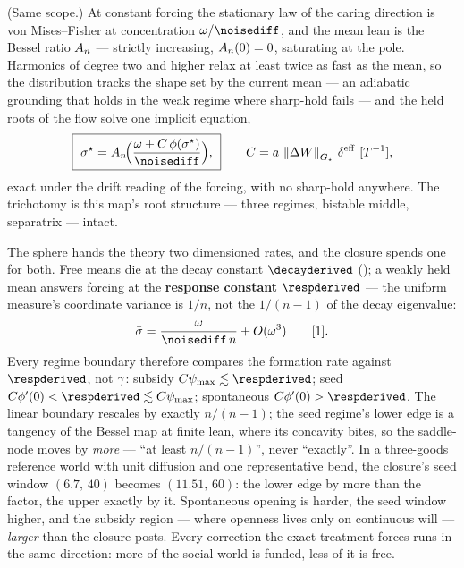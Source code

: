 \documentclass[../main]{subfiles}
\begin{document}
\begin{theorem}%
  (Same scope.) At constant forcing the stationary law of the caring direction is von
  Mises--Fisher at concentration $\will/\noisediff$, and the mean lean is the Bessel
  ratio $A\sb{n}$ --- strictly increasing, $A\sb{n}(0)=0$, saturating at the pole.
  Harmonics of degree two and higher relax at least twice as fast as the mean, so the
  distribution tracks the shape set by the current mean --- an adiabatic grounding that
  holds in the weak regime where sharp-hold fails --- and the held roots of the flow
  solve one implicit equation,
  \begin{equation}
    \boxed{\ \alignfixed=\Abessel\!\Bigl(\frac{\will+C\,\bendfn(\alignfixed)}{\noisediff}\Bigr),\ }
    \qquad C=\hingeA\,\normG{\surplus}\,\effdensity\ \dimrate,
    \label{eq:dyn:exact}
  \end{equation}
  exact under the drift reading of the forcing, with no sharp-hold anywhere. The
  trichotomy  is this map's root structure --- three regimes, bistable
  middle, separatrix --- intact.
\end{theorem}

\begin{theorem}%
%
  The sphere hands the theory two dimensioned rates, and the closure spends one for
  both. Free means die at the decay constant $\decayderived$ (); a
  weakly held mean answers forcing at the \textbf{response constant} $\respderived$ ---
  the uniform measure's coordinate variance is $1/n$, not the $1/(n-1)$ of the decay
  eigenvalue:
  \begin{equation}
    \bar\leanbare=\frac{\will}{\noisediff\,n}+O(\will^{3})
    \qquad\dimratio.
    \label{eq:dyn:response}
  \end{equation}
  Every regime boundary therefore compares the formation rate against $\respderived$, not
  $\gamma$: subsidy $C\psi_{\max}\lesssim\respderived$; seed
  $C\bendfn'(0)<\respderived\lesssim C\psi_{\max}$; spontaneous
  $C\bendfn'(0)>\respderived$. The linear boundary rescales by exactly $n/(n-1)$; the
  seed regime's lower edge is a tangency of the Bessel map at finite lean, where its
  concavity bites, so the saddle-node moves by \emph{more} --- ``at least $n/(n-1)$'',
  never ``exactly''. In a three-goods reference world with unit diffusion and one
  representative bend, the closure's seed window $(6.7,\,40)$ becomes $(11.51,\,60)$:
  the lower edge by more than the factor, the upper exactly by it. Spontaneous opening
  is harder, the seed window higher, and the subsidy region --- where openness lives
  only on continuous will --- \emph{larger} than the closure posts. Every correction
  the exact treatment forces runs in the same direction: more of the social world is
  funded, less of it is free.
\end{theorem}
\end{document}
